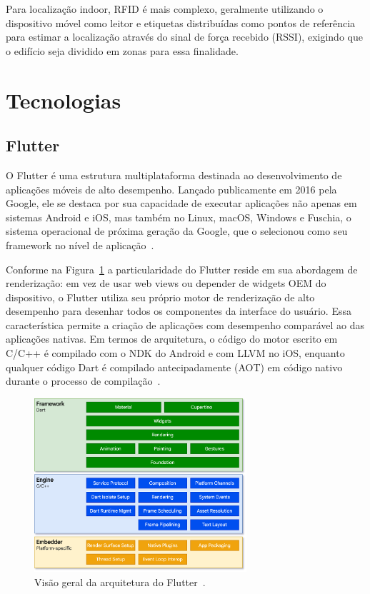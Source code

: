 Para localização indoor, RFID é mais complexo, geralmente utilizando o dispositivo móvel como leitor e etiquetas distribuídas como pontos de referência para estimar a localização através do sinal de força recebido (RSSI), exigindo que o edifício seja dividido em zonas para essa finalidade.


\section{Tecnologias}\label{sec: tecnologias}

\subsection{Flutter}\label{subsec: flutter}
O Flutter é uma estrutura multiplataforma destinada ao desenvolvimento de aplicações móveis de alto desempenho.
Lançado publicamente em 2016 pela Google, ele se destaca por sua capacidade de executar aplicações não apenas em sistemas Android e iOS, mas também no Linux, macOS, Windows e Fuschia, o sistema operacional de próxima geração da Google, que o selecionou como seu framework no nível de aplicação~\cite{wu2018react}.

Conforme na Figura~\ref{fig:architecture} a particularidade do Flutter reside em sua abordagem de renderização: em vez de usar web views ou depender de widgets OEM do dispositivo, o Flutter utiliza seu próprio motor de renderização de alto desempenho para desenhar todos os componentes da interface do usuário.
Essa característica permite a criação de aplicações com desempenho comparável ao das aplicações nativas.
Em termos de arquitetura, o código do motor escrito em C/C++ é compilado com o NDK do Android e com LLVM no iOS, enquanto qualquer código Dart é compilado antecipadamente (AOT) em código nativo durante o processo de compilação~\cite{flutter}.

\begin{figure}
    \centering
    \includegraphics[width=0.7\textwidth]{imagens/flutter_architecture}
    \caption{Visão geral da arquitetura do Flutter~\cite{flutter}.}
    \label{fig:architecture}
\end{figure}

